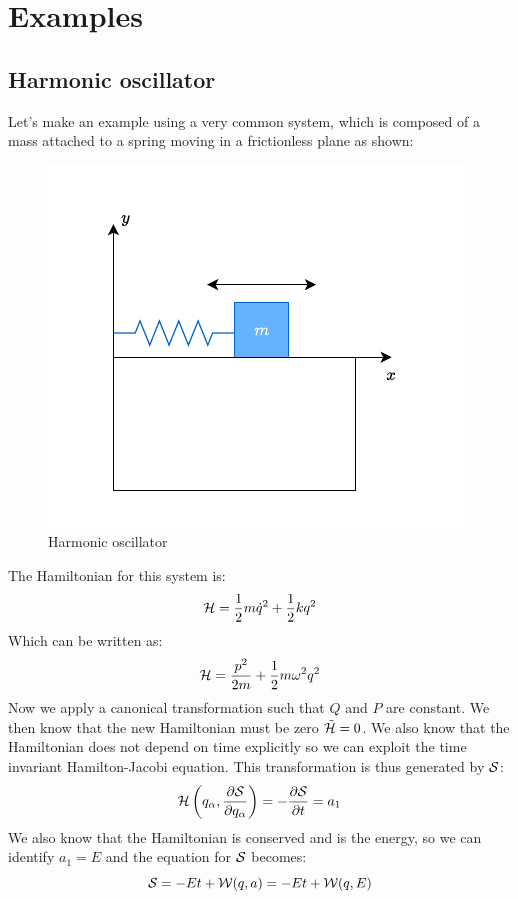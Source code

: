 \section{Examples}
\subsection{Harmonic oscillator}
Let's make an example using a very common system, which is composed of a mass attached to a spring moving in a frictionless plane as shown:
\begin{figure}[H]
  \centering
  \includegraphics[width=0.7\linewidth]{res/svg/harmonic_oscillator.drawio}
  \caption{Harmonic oscillator}
\end{figure}
The Hamiltonian for this system is:
\begin{equation}
  \mathcal{H} = \dfrac{1}{2}m\dot{q}^2 + \dfrac{1}{2}kq^2
\end{equation}
Which can be written as:
\begin{equation}
  \mathcal{H} = \dfrac{p^2}{2m} + \dfrac{1}{2}m\omega^2q^2
\end{equation}
Now we apply a canonical transformation such that $Q$ and $P$ are constant. We then know that the new Hamiltonian must be zero $\tilde{\mathcal{H}} = 0$. We also know that the Hamiltonian does not depend on time explicitly so we can exploit the time invariant Hamilton-Jacobi equation. This transformation is thus generated by $\mathcal{S}$:
\begin{equation}
  \hamfun \brackets{q_{\alpha},\pdv{\action}{q_{\alpha}}} = -\pdv{\action}{t} = a_1
\end{equation}
We also know that the Hamiltonian is conserved and is the energy, so we can identify $a_1 = E$ and the equation for $\mathcal{S}$ becomes:
\begin{equation}
  \mathcal{S} = -Et + \mathcal{W} (q,a) = -Et + \mathcal{W} (q,E)
\end{equation}
